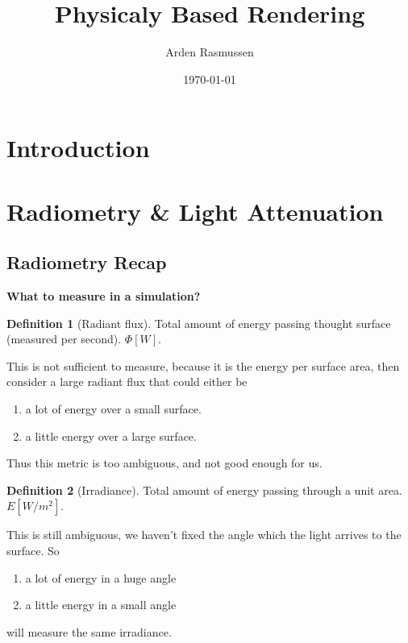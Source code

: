 \documentclass[10pt]{armath}
\title{Physicaly Based Rendering}
\author{Arden Rasmussen}
\date{\today}
\numberwithin{equation}{section}
\theoremstyle{definition}
\newtheorem{definition}{Definition}[section]
\begin{document}
\maketitle

\begin{multicols}{2}
  \section{Introduction}%
  \label{sec:introduction}

  \section{Radiometry \& Light Attenuation}%
  \label{sec:radiometry_&_light_attenuation}

  \subsection{Radiometry Recap}%
  \label{sub:radiometry_recap}

  \textbf{What to measure in a simulation?}

  \begin{definition}[Radiant flux]
    Total amount of energy passing thought surface (measured per second).
    $\Phi\left[W\right]$.
  \end{definition}

  This is not sufficient to measure, because it is the energy per surface area,
  then consider a large radiant flux that could either be
  \begin{enumerate}
    \item a lot of energy over a small surface.
    \item a little energy over a large surface.
  \end{enumerate}

  Thus this metric is too ambiguous, and not good enough for us.

  \begin{definition}[Irradiance]
    Total amount of energy passing through a unit area. $E\left[W/m^2\right]$.
  \end{definition}

  This is still ambiguous, we haven't fixed the angle which the light arrives to the
  surface. So
  \begin{enumerate}
    \item a lot of energy in a huge angle
    \item a little energy in a small angle
  \end{enumerate}
  will measure the same irradiance.


\end{multicols}
\end{document}
